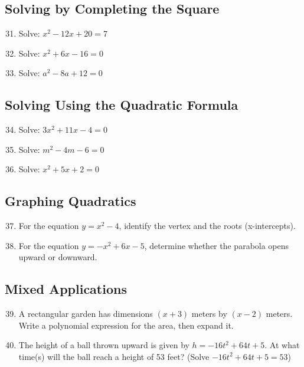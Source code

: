 \documentclass[12pt]{article}
\begin{document}
\subsection*{Solving by Completing the Square}

\begin{enumerate}
\setcounter{enumi}{30}
\item Solve: $x^2 - 12x + 20 = 7$

\item Solve: $x^2 + 6x - 16 = 0$

\item Solve: $a^2 - 8a + 12 = 0$
\end{enumerate}

\subsection*{Solving Using the Quadratic Formula}

\begin{enumerate}
\setcounter{enumi}{33}
\item Solve: $3x^2 + 11x - 4 = 0$

\item Solve: $m^2 - 4m - 6 = 0$

\item Solve: $x^2 + 5x + 2 = 0$
\end{enumerate}

\subsection*{Graphing Quadratics}

\begin{enumerate}
\setcounter{enumi}{36}
\item For the equation $y = x^2 - 4$, identify the vertex and the roots (x-intercepts).

\item For the equation $y = -x^2 + 6x - 5$, determine whether the parabola opens upward or downward.
\end{enumerate}

\subsection*{Mixed Applications}

\begin{enumerate}
\setcounter{enumi}{38}
\item A rectangular garden has dimensions $(x + 3)$ meters by $(x - 2)$ meters. Write a polynomial expression for the area, then expand it.

\item The height of a ball thrown upward is given by $h = -16t^2 + 64t + 5$. At what time(s) will the ball reach a height of 53 feet? (Solve $-16t^2 + 64t + 5 = 53$)
\end{enumerate}
\end{document}
